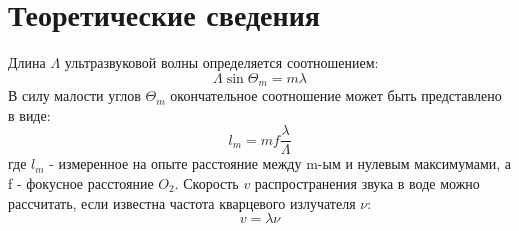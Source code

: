 \documentclass{article}
\begin{document}
\section{Теоретические сведения}
Длина $\Lambda$ ультразвуковой волны определяется соотношением:
\begin{equation}
	\Lambda\sin{\Theta_m} = m\lambda
\end{equation}
В силу малости углов $\Theta_m$ окончательное соотношение может быть представлено в виде:
\begin{equation}
	l_m = mf\frac{\lambda}{\Lambda}
\end{equation}
где $l_m$ - измеренное на опыте расстояние между m-ым и нулевым максимумами, а f - фокусное расстояние $O_2$.
Скорость $v$ распространения звука в воде можно рассчитать, если известна частота кварцевого излучателя $\nu$:
\begin{equation}
	v = \lambda\nu
\end{equation}
\end{document}
